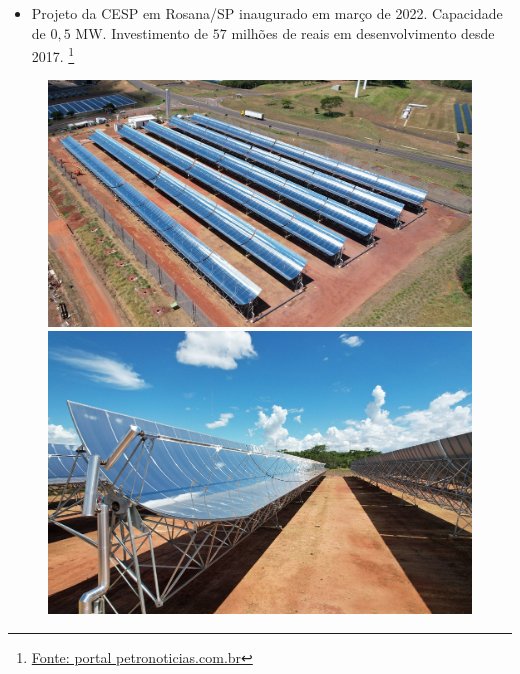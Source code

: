 \documentclass[12pt,notheorems,hyperref={pdfauthor= Rafael Nardi}]{beamer}
\begin{document}
\begin{frame}%

	\begin{itemize} 
		\item Projeto da CESP em Rosana/SP inaugurado em março de 2022. Capacidade
			de $0,5$ MW. Investimento de $57$ milhões de reais em desenvolvimento desde 2017. \footnote{\href{https://petronoticias.com.br/cesp-inaugurou-a-primeira-usina-termossolar-do-pais-em-sao-paulo/}{Fonte: portal petronoticias.com.br}}
	\end{itemize}

	\bigskip

	\begin{figure}[ht]

		\begin{minipage}[b]{.4\linewidth}
			\includegraphics[height=0.62\linewidth]{./CESP_Rosana-SP.jpg}
		\end{minipage}
		\qquad
		\begin{minipage}[b]{.4\linewidth}
			\includegraphics[height=0.62\linewidth]{./CESP_Rosana-SP_2.png}
		\end{minipage}
	\end{figure}

\end{frame}
\end{document}
